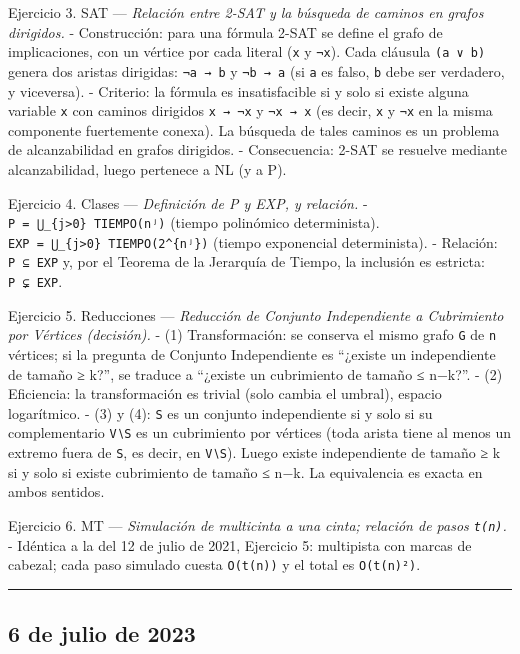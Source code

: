 \documentclass[12pt]{book} %
\begin{document}
Ejercicio 3. SAT --- \emph{Relación entre 2-SAT y la búsqueda de caminos
en grafos dirigidos.} - Construcción: para una fórmula 2-SAT se define
el grafo de implicaciones, con un vértice por cada literal (\texttt{x} y
\texttt{¬x}). Cada cláusula \texttt{(a\ ∨\ b)} genera dos aristas
dirigidas: \texttt{¬a\ →\ b} y \texttt{¬b\ →\ a} (si \texttt{a} es
falso, \texttt{b} debe ser verdadero, y viceversa). - Criterio: la
fórmula es insatisfacible si y solo si existe alguna variable \texttt{x}
con caminos dirigidos \texttt{x\ →\ ¬x} y \texttt{¬x\ →\ x} (es decir,
\texttt{x} y \texttt{¬x} en la misma componente fuertemente conexa). La
búsqueda de tales caminos es un problema de alcanzabilidad en grafos
dirigidos. - Consecuencia: 2-SAT se resuelve mediante alcanzabilidad,
luego pertenece a NL (y a P).

Ejercicio 4. Clases --- \emph{Definición de P y EXP, y relación.} -
\texttt{P\ =\ ⋃\_\{j\textgreater{}0\}\ TIEMPO(nʲ)} (tiempo polinómico
determinista).
\texttt{EXP\ =\ ⋃\_\{j\textgreater{}0\}\ TIEMPO(2\^{}\{nʲ\})} (tiempo
exponencial determinista). - Relación: \texttt{P\ ⊆\ EXP} y, por el
Teorema de la Jerarquía de Tiempo, la inclusión es estricta:
\texttt{P\ ⊊\ EXP}.

Ejercicio 5. Reducciones --- \emph{Reducción de Conjunto Independiente a
Cubrimiento por Vértices (decisión).} - (1) Transformación: se conserva
el mismo grafo \texttt{G} de \texttt{n} vértices; si la pregunta de
Conjunto Independiente es ``¿existe un independiente de tamaño ≥ k?'',
se traduce a ``¿existe un cubrimiento de tamaño ≤ n−k?''. - (2)
Eficiencia: la transformación es trivial (solo cambia el umbral),
espacio logarítmico. - (3) y (4): \texttt{S} es un conjunto
independiente si y solo si su complementario \texttt{V∖S} es un
cubrimiento por vértices (toda arista tiene al menos un extremo fuera de
\texttt{S}, es decir, en \texttt{V∖S}). Luego existe independiente de
tamaño ≥ k si y solo si existe cubrimiento de tamaño ≤ n−k. La
equivalencia es exacta en ambos sentidos.

Ejercicio 6. MT --- \emph{Simulación de multicinta a una cinta; relación
de pasos \texttt{t(n)}.} - Idéntica a la del 12 de julio de 2021,
Ejercicio 5: multipista con marcas de cabezal; cada paso simulado cuesta
\texttt{O(t(n))} y el total es \texttt{O(t(n)²)}.

\begin{center}\rule{0.5\linewidth}{0.5pt}\end{center}

\hypertarget{de-julio-de-2023}{%
\subsection{6 de julio de 2023}\label{de-julio-de-2023}}
\end{document}
